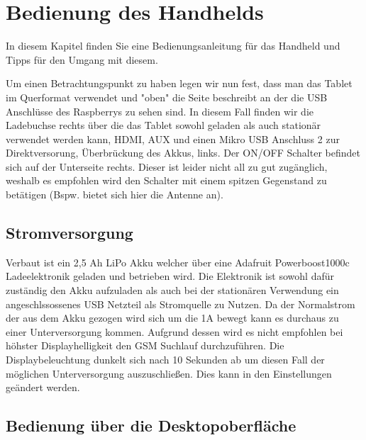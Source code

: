%
%

\chapter{Bedienung des Handhelds}
In diesem Kapitel finden Sie eine Bedienungsanleitung für das Handheld und Tipps für den Umgang mit diesem.

Um einen Betrachtungspunkt zu haben legen wir nun fest, dass man das Tablet im Querformat verwendet und "oben" die Seite beschreibt an der die USB Anschlüsse des Raspberrys zu sehen sind. In diesem Fall finden wir die Ladebuchse rechts über die das Tablet sowohl geladen als auch stationär verwendet werden kann, HDMI, AUX und einen Mikro USB Anschluss 2 zur Direktversorung, Überbrückung des Akkus, links. Der ON/OFF Schalter befindet sich auf der Unterseite rechts. Dieser ist leider nicht all zu gut zugänglich, weshalb es empfohlen wird den Schalter mit einem spitzen Gegenstand zu betätigen (Bspw. bietet sich hier die Antenne an).


\section{Stromversorgung}

Verbaut ist ein 2,5 Ah LiPo Akku welcher über eine Adafruit Powerboost1000c Ladeelektronik geladen und betrieben wird. Die Elektronik ist sowohl dafür zuständig den Akku aufzuladen als auch bei der stationären Verwendung ein angeschlssossenes USB Netzteil als Stromquelle zu Nutzen. Da der Normalstrom der aus dem Akku gezogen wird sich um die 1A bewegt kann es durchaus zu einer Unterversorgung kommen. Aufgrund dessen wird es nicht empfohlen bei höhster Displayhelligkeit den GSM Suchlauf durchzuführen. Die Displaybeleuchtung dunkelt sich nach 10 Sekunden ab um diesen Fall der möglichen Unterversorgung auszuschließen. Dies kann in den Einstellungen geändert werden. 


\section{Bedienung über die Desktopoberfläche}

